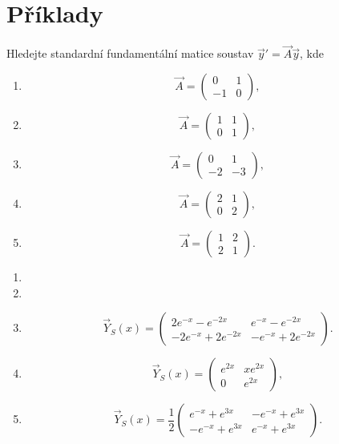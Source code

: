 \section{Příklady}

\begin{ex}
   Hledejte standardní fundamentální matice soustav $\vec{y}'=\vec{A}\vec{y}$, kde
   \begin{enumerate}
      \item
      \[
         \vec{A} = \begin{pmatrix}
            0 & 1\\ -1 & 0
         \end{pmatrix},
      \]
      \item
      \[
         \vec{A} = \begin{pmatrix}
            1 & 1 \\ 0 & 1
         \end{pmatrix},
      \]
      \item
      \[
         \vec{A} = \begin{pmatrix}0 & 1 \\ -2 & -3\end{pmatrix},
      \]
      \item
      \[
         \vec{A} = \begin{pmatrix}2 & 1 \\ 0 & 2\end{pmatrix},
      \]
      \item
      \[
         \vec{A} = \begin{pmatrix}1 & 2 \\ 2 & 1\end{pmatrix}.
      \]
   \end{enumerate}
\end{ex}
\begin{sol}
   \begin{enumerate}
      \item
      \item
      \item
      \[
         \vec{Y}_S(x) = \begin{pmatrix}2e^{-x}-e^{-2x}&e^{-x}-e^{-2x}\\-2e^{-x}+2e^{-2x}&-e^{-x}+2e^{-2x}\end{pmatrix}.
      \]
      \item
      \[
         \vec{Y}_S(x) = \begin{pmatrix}e^{2x}&xe^{2x}\\0&e^{2x}\end{pmatrix},
      \]
      \item
      \[
         \vec{Y}_S(x) = \frac{1}{2}\begin{pmatrix}e^{-x}+e^{3x}&-e^{-x}+e^{3x}\\-e^{-x}+e^{3x}&e^{-x}+e^{3x}\end{pmatrix}.
      \]
   \end{enumerate}
\end{sol}

